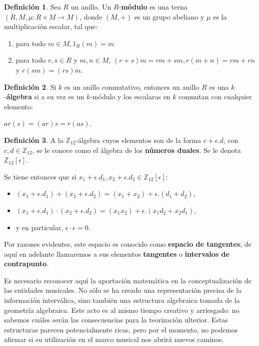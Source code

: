 \documentclass[letterpaper,12pt]{book}
\theoremstyle{definition} \newtheorem{Def}{Definición}[chapter]
\theoremstyle{definition} \newtheorem{Teo}{Teorema}[chapter]
\theoremstyle{definition} \newtheorem{Pro}{Proposición}[chapter]
\theoremstyle{definition} \newtheorem{Lema}{Lema}[chapter]
\begin{document}
 \begin{Def}
  Sea $R$ un anillo. Un $R$-\textbf{módulo} es una terna $(R,M,\mu:R \times M \to M)$, donde $(M,+)$ es un grupo abeliano y $\mu$ es la multiplicación escalar, tal que:
 \begin{enumerate}
   \item para todo $m  \in M,1_R(m)=m$
   \item para todo $r,s  \in R$ y $m,n  \in M$, $(r+s)m=rm+sm, r(m+n)=rm+rn$ y $r(sm)=(rs)m$. 
  \end{enumerate}  
 \end{Def}
  
\begin{Def}
Si $k$ es un anillo conmutativo, entonces un anillo $R$ es una $k$-\textbf{álgebra} si a su vez es un $k$-módulo y los escalaras en $k$ conmutan con cualquier elemento:

\centering $ar(s)=(ar)s=r(as)$.  
\end{Def}
    
\begin{Def}
A la $\mathbb{Z}_{12}$-álgebra cuyos elementos son de la forma $c+\epsilon .d$, con $c,d \in \mathbb{Z}_{12}$, se le conoce como el álgebra de los \textbf{números duales}. Se le denota $\mathbb{Z}_{12}[\epsilon]$.
\end{Def}  

Se tiene entonces que si $x_1+\epsilon.d_1,x_2+\epsilon.d_2 \in \mathbb{Z}_{12}[\epsilon]$:  
\begin{itemize}
\item[]$(x_1+\epsilon.d_1)+(x_2+\epsilon.d_2)=(x_1+x_2)+\epsilon.(d_1+d_2)$,
\item[]$(x_1+\epsilon.d_1)\cdot(x_2+\epsilon.d_2)=(x_1x_2)+\epsilon.(x_1d_2+x_2d_1)$,
\item[]y en particular, $\epsilon\cdot\epsilon=0$. 
\end{itemize} 

Por razones evidentes, este espacio es conocido como \textbf{espacio de tangentes}; de aquí en adelante llamaremos a sus elementos \textbf{tangentes} o \textbf{intervalos de contrapunto}. 

Es necesario reconocer aquí la aportación matemática en la conceptualización de las entidades musicales. No sólo se ha creado una representación precisa de la información interválica, sino también una estructura algebraica tomada de la geometría algebraica. Este acto es al mismo tiempo creativo y arriesgado: no sabemos cuáles serán las consecuencias para la teorización ulterior. Estas estructuras parecen potencialmente ricas, pero por el momento, no podemos afirmar si su utilización en el marco musical nos abrirá nuevos caminos.
\end{document}
